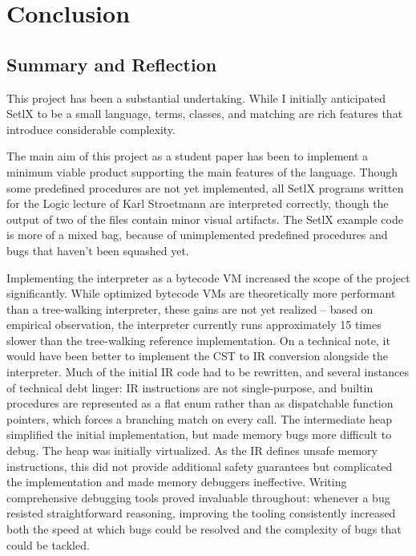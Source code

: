 \chapter{Conclusion}

\section{Summary and Reflection}

This project has been a substantial undertaking. While I initially anticipated SetlX to be a small language, terms, classes, and matching are rich features that introduce considerable complexity.

The main aim of this project as a student paper has been to implement a minimum viable product supporting the main features of the language. Though some predefined procedures are not yet implemented, all SetlX programs written for the Logic lecture of Karl Stroetmann are interpreted correctly, though the output of two of the files contain minor visual artifacts. The SetlX example code is more of a mixed bag, because of unimplemented predefined procedures and bugs that haven't been squashed yet.

Implementing the interpreter as a bytecode \ac{VM} increased the scope of the project significantly. While optimized bytecode \ac{VM}s are theoretically more performant than a tree-walking interpreter, these gains are not yet realized -- based on empirical observation, the interpreter currently runs approximately 15 times slower than the tree-walking reference implementation. On a technical note, it would have been better to implement the \ac{CST} to \ac{IR} conversion alongside the interpreter. Much of the initial \ac{IR} code had to be rewritten, and several instances of technical debt linger: \ac{IR} instructions are not single-purpose, and builtin procedures are represented as a flat enum rather than as dispatchable function pointers, which forces a branching match on every call. The intermediate heap simplified the initial implementation, but made memory bugs more difficult to debug. The heap was initially virtualized. As the \ac{IR} defines unsafe memory instructions, this did not provide additional safety guarantees but complicated the implementation and made memory debuggers ineffective. Writing comprehensive debugging tools proved invaluable throughout: whenever a bug resisted straightforward reasoning, improving the tooling consistently increased both the speed at which bugs could be resolved and the complexity of bugs that could be tackled.

